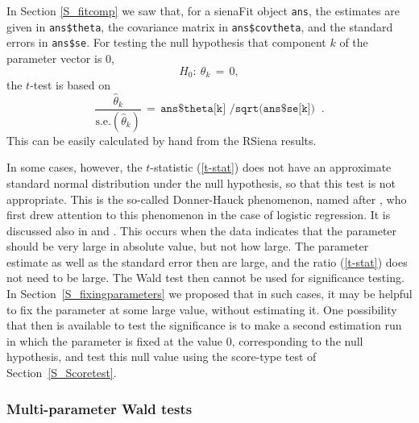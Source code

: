 \documentclass[a4paper,fleqn,11pt]{article}
\newcommand{\+}{\, + \,}
\newcommand{\se}{\mbox{s.e.}}
\newcommand{\RS}{{\sf RSiena }}
\begin{document}
In Section \ref{S_fitcomp} we saw that, for a \textsf{sienaFit}
object \texttt{ans}, the estimates are given in
\texttt{ans\$theta}, the covariance matrix in \texttt{ans\$covtheta},
and the standard errors in \texttt{ans\$se}.
For testing the null hypothesis that component $k$ of the parameter
vector is 0,
\[
H_0 : \ \theta_k \,=\, 0 ,
\]
the $t$-test is based on
\begin{equation}
\frac{\hat\theta_k}{\se(\hat\theta_k)} \,=\,
   \texttt{ans\$theta[k] /sqrt(ans\$se[k]) } \ .  \label{t-stat}
\end{equation}
This can be easily calculated by hand from the \RS results.
\medskip

In some cases, however, the $t$-statistic (\ref{t-stat}) does not have
an approximate standard normal distribution under the null hypothesis,
so that this test is not appropriate.
This is the so-called Donner-Hauck phenomenon, named after
\citet{HauckDonner77}, who first drew attention to this phenomenon
in the case of logistic regression. It is discussed also in
\citet[section 1.6]{GeyerThompson92} and \citet{AlbertAnderson84}.
This occurs when the data indicates that the parameter
should be very large in absolute value, but not how large.
The parameter estimate as well as the standard error then are large,
and the ratio (\ref{t-stat}) does not need to be large.
The Wald test then cannot be used for significance testing.
In Section~\ref{S_fixingparameters} we proposed that in such cases,
it may be helpful to fix the parameter at some large value,
without estimating it.
One possibility that then is available to test the significance
is to make a second estimation run in which the parameter is fixed at
the value 0, corresponding to the null hypothesis, and test
this null value using the score-type test of Section~\ref{S_Scoretest}.

\subsubsection*{Multi-parameter Wald tests}
\end{document}
